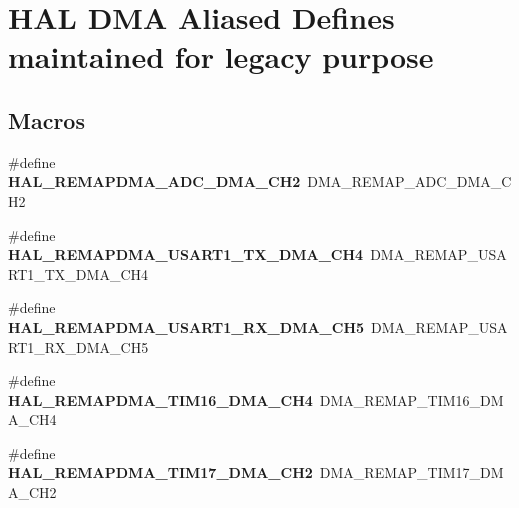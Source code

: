 \hypertarget{group___h_a_l___d_m_a___aliased___defines}{}\section{H\+AL D\+MA Aliased Defines maintained for legacy purpose}
\label{group___h_a_l___d_m_a___aliased___defines}
\subsection*{Macros}
\begin{DoxyCompactItemize}
\item 
\#define {\bfseries H\+A\+L\+\_\+\+R\+E\+M\+A\+P\+D\+M\+A\+\_\+\+A\+D\+C\+\_\+\+D\+M\+A\+\_\+\+C\+H2}~D\+M\+A\+\_\+\+R\+E\+M\+A\+P\+\_\+\+A\+D\+C\+\_\+\+D\+M\+A\+\_\+\+C\+H2\hypertarget{group___h_a_l___d_m_a___aliased___defines_gab67dabe51720b5e84e798243b52428c7}{}\label{group___h_a_l___d_m_a___aliased___defines_gab67dabe51720b5e84e798243b52428c7}

\item 
\#define {\bfseries H\+A\+L\+\_\+\+R\+E\+M\+A\+P\+D\+M\+A\+\_\+\+U\+S\+A\+R\+T1\+\_\+\+T\+X\+\_\+\+D\+M\+A\+\_\+\+C\+H4}~D\+M\+A\+\_\+\+R\+E\+M\+A\+P\+\_\+\+U\+S\+A\+R\+T1\+\_\+\+T\+X\+\_\+\+D\+M\+A\+\_\+\+C\+H4\hypertarget{group___h_a_l___d_m_a___aliased___defines_ga9f990969f0752e658ca3b1ca5fef46b8}{}\label{group___h_a_l___d_m_a___aliased___defines_ga9f990969f0752e658ca3b1ca5fef46b8}

\item 
\#define {\bfseries H\+A\+L\+\_\+\+R\+E\+M\+A\+P\+D\+M\+A\+\_\+\+U\+S\+A\+R\+T1\+\_\+\+R\+X\+\_\+\+D\+M\+A\+\_\+\+C\+H5}~D\+M\+A\+\_\+\+R\+E\+M\+A\+P\+\_\+\+U\+S\+A\+R\+T1\+\_\+\+R\+X\+\_\+\+D\+M\+A\+\_\+\+C\+H5\hypertarget{group___h_a_l___d_m_a___aliased___defines_gaee098de174f870c95b0853e34dddd92b}{}\label{group___h_a_l___d_m_a___aliased___defines_gaee098de174f870c95b0853e34dddd92b}

\item 
\#define {\bfseries H\+A\+L\+\_\+\+R\+E\+M\+A\+P\+D\+M\+A\+\_\+\+T\+I\+M16\+\_\+\+D\+M\+A\+\_\+\+C\+H4}~D\+M\+A\+\_\+\+R\+E\+M\+A\+P\+\_\+\+T\+I\+M16\+\_\+\+D\+M\+A\+\_\+\+C\+H4\hypertarget{group___h_a_l___d_m_a___aliased___defines_ga4ff45d813656296b6f9226f333a22fc3}{}\label{group___h_a_l___d_m_a___aliased___defines_ga4ff45d813656296b6f9226f333a22fc3}

\item 
\#define {\bfseries H\+A\+L\+\_\+\+R\+E\+M\+A\+P\+D\+M\+A\+\_\+\+T\+I\+M17\+\_\+\+D\+M\+A\+\_\+\+C\+H2}~D\+M\+A\+\_\+\+R\+E\+M\+A\+P\+\_\+\+T\+I\+M17\+\_\+\+D\+M\+A\+\_\+\+C\+H2\hypertarget{group___h_a_l___d_m_a___aliased___defines_ga4f0dcd990b13d8fd3de0ed0bfd6be555}{}\label{group___h_a_l___d_m_a___aliased___defines_ga4f0dcd990b13d8fd3de0ed0bfd6be555}


\end{DoxyCompactItemize}
